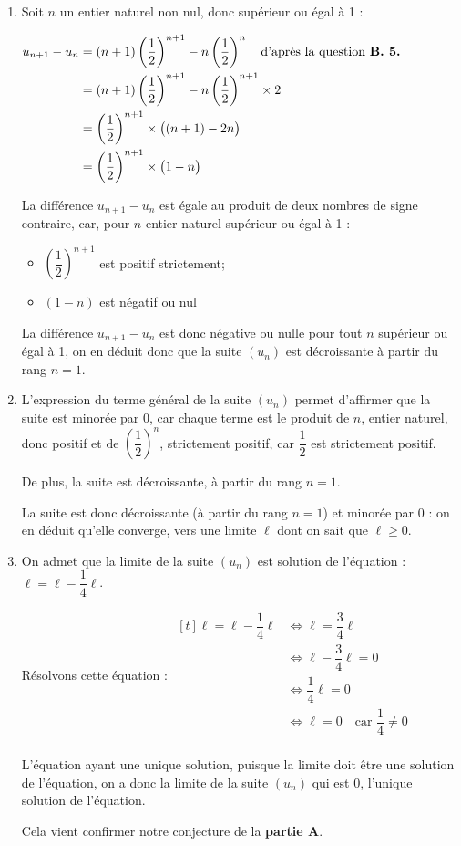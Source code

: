 \documentclass[10pt]{article}
\begin{document}
\begin{enumerate}
\item Soit $n$ un entier naturel non nul, donc supérieur ou égal à 1 :

$\begin{aligned}
			u_{n+1} - u_n &= (n+1)\left(\dfrac{1}{2}\right)^{n+1} - n\left(\dfrac{1}{2}\right)^{n}\quad \text{d'après la question \textbf{B. 5.}}\\
	&= (n+1)\left(\dfrac{1}{2}\right)^{n+1} - n\left(\dfrac{1}{2}\right)^{n+1} \times 2\\
	&= \left(\dfrac{1}{2}\right)^{n+1} \times\big((n+1) -2n \big) \\
	&= \left(\dfrac{1}{2}\right)^{n+1} \times\big(1-n\big) \\
\end{aligned}$

La différence $u_{n+1} - u_n$ est égale au produit de deux nombres de signe contraire, car, pour $n$ entier naturel supérieur ou égal à 1 :
\begin{itemize}
			\item $\left(\dfrac{1}{2}\right)^{n+1}$ est positif strictement;
			\item $(1 - n)$ est négatif ou nul
\end{itemize}

La différence $u_{n+1} - u_n$ est donc négative ou nulle pour tout $n$ supérieur ou égal à 1, on en déduit donc que la suite $(u_{n})$ est décroissante à partir du rang $n=1$.

\item L'expression du terme général de la suite $(u_n)$ permet d'affirmer que la suite est minorée par 0, car chaque terme est le produit de $n$, entier naturel, donc positif et de $\left(\dfrac{1}{2}\right)^{n}$, strictement positif, car $\dfrac{1}{2}$ est strictement positif.

De plus, la suite est décroissante, à partir du rang $n= 1$.

La suite est donc décroissante (à partir du rang $n=1$) et minorée par 0 : on en déduit qu'elle converge, vers une limite $\ell$ dont on sait que $\ell \geqslant0$.

\item On admet que la limite de la suite $\left(u_{n}\right)$ est solution de l'équation : $\ell=\ell-\dfrac{1}{4} \ell$.

Résolvons cette équation :\quad 
$\begin{aligned}[t]
	\ell=\ell-\dfrac{1}{4} \ell
	&\iff \ell = \dfrac{3}{4}\ell\\
	&\iff \ell - \dfrac{3}{4}\ell = 0\\
	&\iff \dfrac{1}{4}\ell = 0\\
	&\iff \ell = 0\quad \text{car } \dfrac{1}{4}\neq 0\\
\end{aligned}$

L'équation ayant une unique solution, puisque la limite doit être une solution de l'équation, on a donc la limite de la suite $\left(u_{n}\right)$ qui est 0, l'unique solution de l'équation.

Cela vient confirmer notre conjecture de la \textbf{partie A}.
	\end{enumerate}
\end{document}
